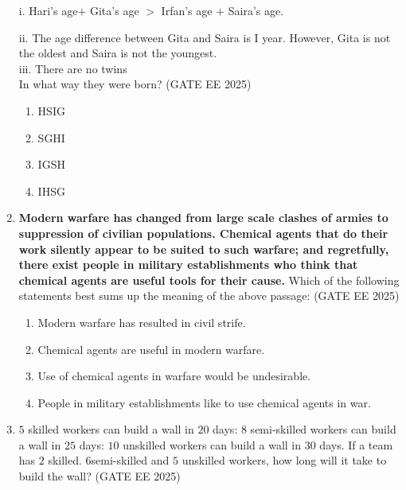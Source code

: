 \documentclass[journal]{IEEEtran}
\begin{document}
\begin{enumerate}[start=26]
i. Hari's age$+$ Gita's age $>$ Irfan's age $+$ Saira's age.

ii. The age difference between Gita and Saira is I year. However, Gita is not the oldest and Saira is not the youngest.\\
iii. There are no twins\\
In what way they were born?
\hfill{(GATE EE 2025)}
\begin{enumerate}
    \item  HSIG
\item  SGHI
\item  IGSH
\item  IHSG

\end{enumerate}

\item \textbf{Modern warfare has changed from large scale clashes of armies to suppression of civilian populations. Chemical agents that do their work silently appear to be suited to such warfare; and regretfully, there exist people in military establishments who think that chemical agents are useful tools for their cause.}
Which of the following statements best sums up the meaning of the above passage:
\hfill{(GATE EE 2025)}
\begin{enumerate}
    \item  Modern warfare has resulted in civil strife.

\item  Chemical agents are useful in modern warfare.
\item  Use of chemical agents in warfare would be undesirable.
\item  People in military establishments like to use chemical agents in war.
\end{enumerate}

\item  $5$ skilled workers can build a wall in $20$ days: $8$ semi-skilled workers can build a wall in $25$ days: $10$ unskilled workers can build a wall in $30$ days. If a team has $2$ skilled. $6$semi-skilled and $5$ unskilled workers, how long will it take to build the wall?
\hfill{(GATE EE 2025)}
\begin{enumerate}
\end{enumerate}


\end{enumerate}
\end{document}
